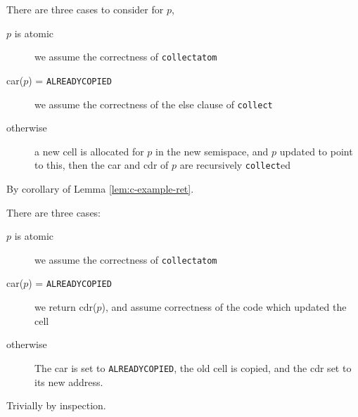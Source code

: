 \begin{lemma}
  \label{lem:c-example-reach}
  There are three cases to consider for $p$,

  \begin{description}
  \item[$p$ is atomic] we assume the correctness of
    \texttt{collectatom}

  \item[car($p$) = \texttt{ALREADYCOPIED}] we assume the correctness
    of the else clause of \texttt{collect}

  \item[otherwise] a new cell is allocated for $p$ in the new
    semispace, and $p$ updated to point to this, then the car and cdr
    of $p$ are recursively \texttt{collect}ed
  \end{description}
\end{lemma}

\begin{lemma}
  \label{lem:c-example-duplication}
  By corollary of Lemma \ref{lem:c-example-ret}.
\end{lemma}

\begin{lemma}
  \label{lem:c-example-ret}
  There are three cases:

  \begin{description}
  \item[$p$ is atomic] we assume the correctness of
    \texttt{collectatom}

  \item[car($p$) = \texttt{ALREADYCOPIED}] we return cdr($p$), and
    assume correctness of the code which updated the cell

  \item[otherwise] The car is set to \texttt{ALREADYCOPIED}, the old
    cell is copied, and the cdr set to its new address.
  \end{description}
\end{lemma}

\begin{lemma}
  \label{lem:c-example-update}
  Trivially by inspection.
\end{lemma}


